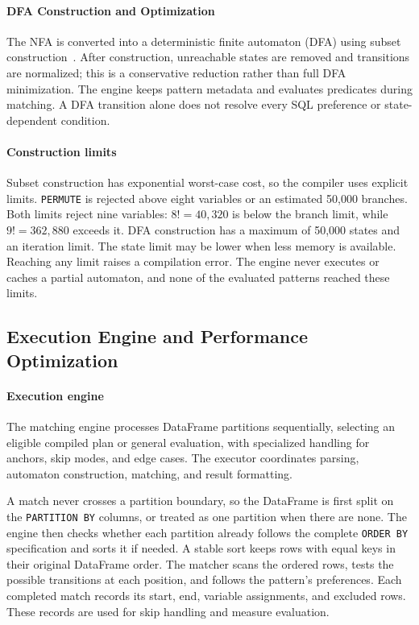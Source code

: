 \documentclass[preprint,12pt,times,a4paper]{elsarticle}
\begin{document}
\paragraph{DFA Construction and Optimization}
The NFA is converted into a deterministic finite automaton (DFA) using subset
construction~\cite{HopcroftUllman}. After construction,
unreachable states are removed and transitions are normalized; this is a
conservative reduction rather than full DFA minimization. The engine keeps
pattern metadata and evaluates predicates during matching. A DFA transition
alone does not resolve every SQL preference or state-dependent condition.

\paragraph{Construction limits} Subset construction has exponential worst-case
cost, so the compiler uses explicit limits. \texttt{PERMUTE} is rejected
above eight variables or an estimated 50,000 branches. Both limits reject
nine variables: $8! = 40{,}320$ is below the branch limit, while
$9! = 362{,}880$ exceeds it. DFA construction has a maximum of 50,000
states and an iteration limit. The state limit may be lower when less
memory is available. Reaching any limit raises a compilation error. The
engine never executes or caches a partial automaton, and none of the
evaluated patterns reached these limits.

\subsection{Execution Engine and Performance Optimization}

\paragraph{Execution engine}
The matching engine processes DataFrame partitions sequentially, selecting an
eligible compiled plan or general evaluation, with specialized handling for
anchors, skip modes, and edge cases. The executor coordinates parsing,
automaton construction, matching, and result formatting.

A match never crosses a partition boundary, so the DataFrame is first split on
the \texttt{PARTITION BY} columns, or treated as one partition when there are
none. The engine then checks whether each partition already follows the
complete \texttt{ORDER BY} specification and sorts it if needed. A stable
sort keeps rows with equal keys in their original DataFrame order. The matcher
scans the ordered rows, tests the possible transitions at each position, and
follows the pattern's preferences. Each completed match records its start,
end, variable assignments, and excluded rows. These records are used for skip
handling and measure evaluation.
\end{document}
